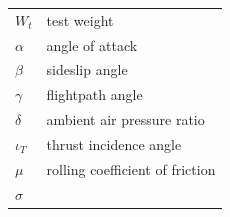 \documentclass[
]{book}
\begin{document}
\begin{longtable}[]{@{}ll@{}}
\begin{minipage}[t]{0.14\columnwidth}
\(W_t\)\strut
\end{minipage} & \begin{minipage}[t]{0.80\columnwidth}\raggedright
test weight\strut
\end{minipage}\tabularnewline
\begin{minipage}[t]{0.14\columnwidth}\raggedright
\(\alpha\)\strut
\end{minipage} & \begin{minipage}[t]{0.80\columnwidth}\raggedright
angle of attack\strut
\end{minipage}\tabularnewline
\begin{minipage}[t]{0.14\columnwidth}\raggedright
\(\beta\)~\strut
\end{minipage} & \begin{minipage}[t]{0.80\columnwidth}\raggedright
sideslip angle\strut
\end{minipage}\tabularnewline
\begin{minipage}[t]{0.14\columnwidth}\raggedright
\(\gamma\)\strut
\end{minipage} & \begin{minipage}[t]{0.80\columnwidth}\raggedright
flightpath angle\strut
\end{minipage}\tabularnewline
\begin{minipage}[t]{0.14\columnwidth}\raggedright
\(\delta\)\strut
\end{minipage} & \begin{minipage}[t]{0.80\columnwidth}\raggedright
ambient air pressure ratio\strut
\end{minipage}\tabularnewline
\begin{minipage}[t]{0.14\columnwidth}\raggedright
\(\iota_T\)\strut
\end{minipage} & \begin{minipage}[t]{0.80\columnwidth}\raggedright
thrust incidence angle\strut
\end{minipage}\tabularnewline
\begin{minipage}[t]{0.14\columnwidth}\raggedright
\(\mu\)\strut
\end{minipage} & \begin{minipage}[t]{0.80\columnwidth}\raggedright
rolling coefficient of friction\strut
\end{minipage}\tabularnewline
\begin{minipage}[t]{0.14\columnwidth}\raggedright
\(\sigma\)\strut
\end{minipage} & \begin{minipage}[t]{0.80\columnwidth}\raggedright

\end{minipage}
\end{longtable}
\end{document}

